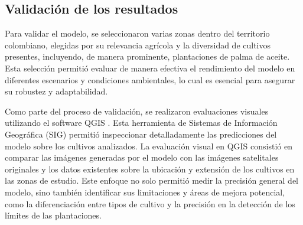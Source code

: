 \subsection{Validación de los resultados}

Para validar el modelo, se seleccionaron varias zonas dentro del territorio colombiano, elegidas por su relevancia agrícola y la diversidad de cultivos presentes, incluyendo, de manera prominente, plantaciones de palma de aceite. Esta selección permitió evaluar de manera efectiva el rendimiento del modelo en diferentes escenarios y condiciones ambientales, lo cual es esencial para asegurar su robustez y adaptabilidad.

Como parte del proceso de validación, se realizaron evaluaciones visuales utilizando el software QGIS \cite{QGIS_software}. Esta herramienta de Sistemas de Información Geográfica (SIG) permitió inspeccionar detalladamente las predicciones del modelo sobre los cultivos analizados. La evaluación visual en QGIS consistió en comparar las imágenes generadas por el modelo con las imágenes satelitales originales y los datos existentes sobre la ubicación y extensión de los cultivos en las zonas de estudio. Este enfoque no solo permitió medir la precisión general del modelo, sino también identificar sus limitaciones y áreas de mejora potencial, como la diferenciación entre tipos de cultivo y la precisión en la detección de los límites de las plantaciones.
